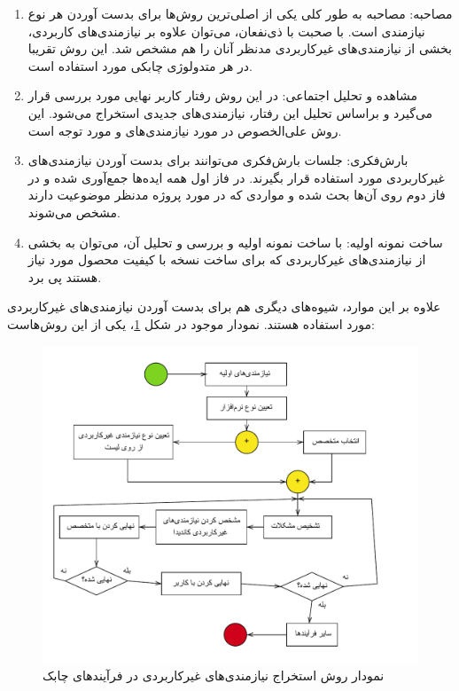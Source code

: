{\begin{enumerate}[a)]
	\begin{enumerate}[1]
		\item 
		مصاحبه: مصاحبه به طور کلی یکی از اصلی‌ترین روش‌ها برای بدست آوردن هر نوع نیازمندی است. با صحبت با ذی‌نفعان، می‌توان علاوه بر نیازمندی‌های کاربردی، بخشی از نیازمندی‌های غیرکاربردی مدنظر آنان را هم مشخص شد. این روش تقریبا در هر متدولوژی چابکی مورد استفاده است.
		
		\item 
		مشاهده و تحلیل اجتماعی: در این روش رفتار کاربر نهایی مورد بررسی قرار می‌گیرد و براساس تحلیل این رفتار، نیازمندی‌های جدیدی استخراج می‌شود. این روش علی‌الخصوص در مورد نیازمندی‌های  و  مورد توجه است.
		
		\item
		بارش‌فکری: جلسات بارش‌فکری می‌توانند برای بدست آوردن نیازمندی‌های غیرکاربردی مورد استفاده قرار بگیرند. در فاز اول همه ایده‌ها جمع‌آوری شده و در فاز دوم روی آن‌ها بحث شده و مواردی که در مورد پروژه مدنظر موضوعیت دارند مشخص می‌شوند.
		
		\item
		ساخت‌ نمونه اولیه: با ساخت نمونه اولیه  و بررسی و تحلیل آن، می‌توان به بخشی از نیازمندی‌های غیرکاربردی که برای ساخت نسخه با کیفیت محصول مورد نیاز هستند پی برد.
		
	
	\end{enumerate}

علاوه بر این موارد، شیوه‌های دیگری هم برای بدست آوردن نیازمندی‌های غیرکاربردی مورد استفاده هستند. نمودار موجود در شکل \ref{fig1}، یکی از این روش‌هاست:



\begin{center}
	\begin{figure}
		
			\includegraphics[scale=1.0]{figs/graph.pdf}
	\caption{نمودار روش استخراج نیازمندی‌های غیرکاربردی در فرآیند‌های چابک \cite{guideline}}	
	\label{fig1}
\end{figure}


\end{center}
\end{enumerate}}

